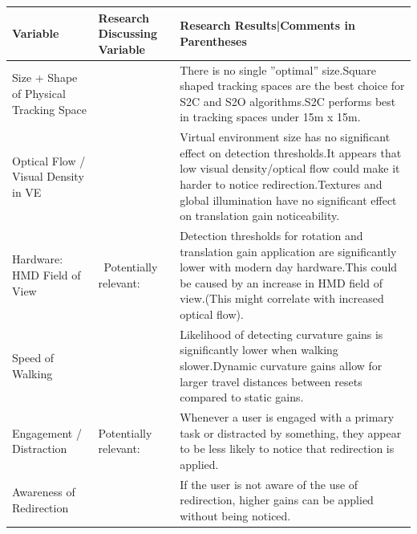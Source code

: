 \begin{table}[!h]
\centering
\begin{tabularx}{\textwidth}{|m{2cm}|m{1.7cm}|m{10.1cm}|} 
\hline
Variable & Research Discussing Variable & Research Results|Comments in Parentheses\\
\hline
Size + Shape of Physical Tracking Space & 
\cite{azmandian2015physical} & 
There is no single ''optimal'' size.\newline Square shaped tracking spaces are the best choice for S2C and S2O algorithms.\newline S2C performs best in tracking spaces under 15m x 15m.\\
\hline
Optical Flow / Visual Density in VE & ~\cite{8446225, steinicke2008moving, 8446216, waldow2018textures} & Virtual environment size has no significant effect on detection thresholds.\newline It appears that low visual density/optical flow could make it harder to notice redirection.\newline Textures and global illumination have no significant effect on translation gain noticeability.\\
\hline
Hardware: HMD Field of View &
~\cite{fuglestad2018redirected}\newline Potentially relevant:\newline\cite{norouzi2018assessing} &
Detection thresholds for rotation and translation gain application are significantly lower with modern day hardware.\newline This could be caused by an increase in HMD field of view.\newline(This might correlate with increased optical flow).\\
\hline
Speed of Walking & \cite{5759454} & Likelihood of detecting curvature gains is significantly lower when walking slower.\newline Dynamic curvature gains allow for larger travel distances between resets compared to static gains.\\
\hline
Engagement / Distraction & \cite{5072212, schmitz2018you, sra2018vmotion}\newline Potentially relevant:\newline\cite{norouzi2018assessing, 5759454} & Whenever a user is engaged with a primary task or distracted by something, they appear to be less likely to notice that redirection is applied.\\
\hline
Awareness of Redirection & \cite{5072212} & If the user is not aware of the use of redirection, higher gains can be applied without being noticed.\\

\end{tabularx}
\end{table}
